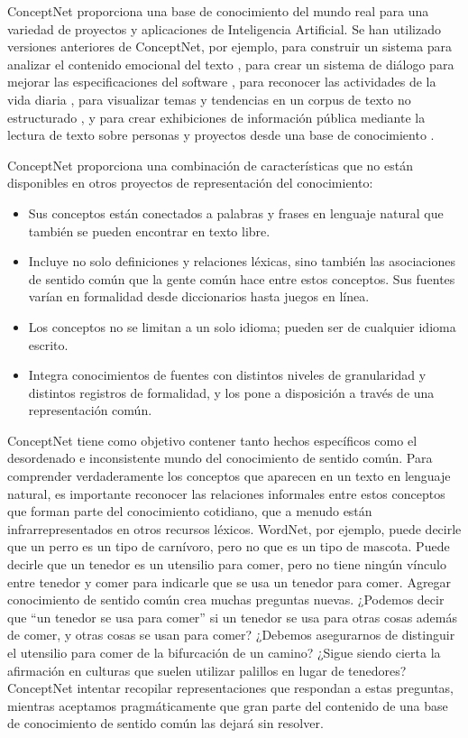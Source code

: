 ConceptNet proporciona una base de conocimiento del mundo real para una variedad de proyectos y aplicaciones de Inteligencia Artificial.
Se han utilizado versiones anteriores de ConceptNet, por ejemplo, para construir un sistema para analizar el contenido emocional del texto \cite{Cambria2010}, para crear un sistema de diálogo para mejorar las especificaciones del software \cite{Korner2009}, para reconocer las actividades de la vida diaria \cite{Ullberg2010}, para visualizar temas y tendencias en un corpus de texto no estructurado \cite{Speer2010}, y para crear exhibiciones de información pública mediante la lectura de texto sobre personas y proyectos desde una base de conocimiento \cite{Havasi2011}.

ConceptNet proporciona una combinación de características que no están disponibles en otros proyectos de representación del conocimiento:
\begin{itemize}
  \item Sus conceptos están conectados a palabras y frases en lenguaje natural que también se pueden encontrar en texto libre.
  \item Incluye no solo definiciones y relaciones léxicas, sino también las asociaciones de sentido común que la gente común hace entre estos conceptos. Sus fuentes varían en formalidad desde diccionarios hasta juegos en línea.
  \item Los conceptos no se limitan a un solo idioma; pueden ser de cualquier idioma escrito.
  \item Integra conocimientos de fuentes con distintos niveles de granularidad y distintos registros de formalidad, y los pone a disposición a través de una representación común.
\end{itemize}

ConceptNet tiene como objetivo contener tanto hechos específicos como el desordenado e inconsistente mundo del conocimiento de sentido común.
Para comprender verdaderamente los conceptos que aparecen en un texto en lenguaje natural, es importante reconocer las relaciones informales entre estos conceptos que forman parte del conocimiento cotidiano, que a menudo están infrarrepresentados en otros recursos léxicos.
WordNet, por ejemplo, puede decirle que un perro es un tipo de carnívoro, pero no que es un tipo de mascota.
Puede decirle que un tenedor es un utensilio para comer, pero no tiene ningún vínculo entre tenedor y comer para indicarle que se usa un tenedor para comer.
Agregar conocimiento de sentido común crea muchas preguntas nuevas. ¿Podemos decir que “un tenedor se usa para comer” si un tenedor se usa para otras cosas además de comer, y otras cosas se usan para comer? ¿Debemos asegurarnos de distinguir el utensilio para comer de la bifurcación de un camino? ¿Sigue siendo cierta la afirmación en culturas que suelen utilizar palillos en lugar de tenedores?
ConceptNet intentar recopilar representaciones que respondan a estas preguntas, mientras aceptamos pragmáticamente que gran parte del contenido de una base de conocimiento de sentido común las dejará sin resolver.

